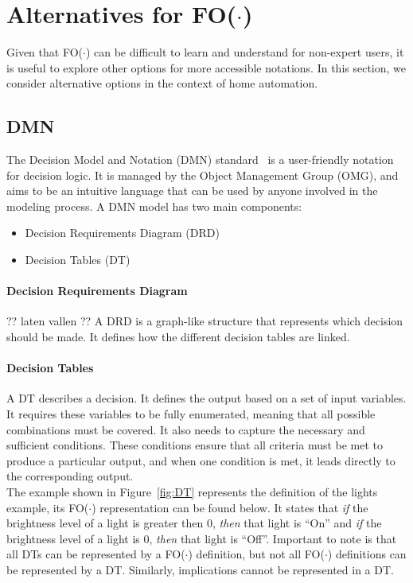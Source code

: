\documentclass[11pt,a4paper]{report}
\newcommand{\fodot}{FO($\cdot$)\xspace}
\begin{document}
\section{Alternatives for \fodot}
Given that \fodot can be difficult to learn and understand for non-expert users, it is useful to explore other options for more accessible notations. In this section, we consider alternative options in the context of home automation.

\subsection{DMN}
The Decision Model and Notation (DMN) standard~\cite{DMN} is a user-friendly notation for decision logic. It is managed by the Object Management Group (OMG), and aims to be an intuitive language that can be used by anyone involved in the modeling process. A DMN model has two main components:
\begin{itemize}
	\item Decision Requirements Diagram (DRD)
    \item Decision Tables (DT)
\end{itemize}

\paragraph{Decision Requirements Diagram}
?? laten vallen ??
A DRD is a graph-like structure that represents which decision should be made. It defines how the different decision tables are linked.
\paragraph{Decision Tables}
A DT describes a decision. It defines the output based on a set of input variables. It requires these variables to be fully enumerated, meaning that all possible combinations must be covered. It also needs to capture the necessary and sufficient conditions. These conditions ensure that all criteria must be met to produce a particular output, and when one condition is met, it leads directly to the corresponding output.\\
The example shown in Figure~\ref{fig:DT} represents the definition of the lights example, its \fodot representation can be found below. It states that \textit{if} the brightness level of a light is greater then 0, \textit{then} that light is ``On'' and \textit{if} the brightness level of a light is 0, \textit{then} that light is ``Off''. Important to note is that all DTs can be represented by a \fodot definition, but not all \fodot definitions can be represented by a DT. Similarly, implications cannot be represented in a DT. 
\end{document}
